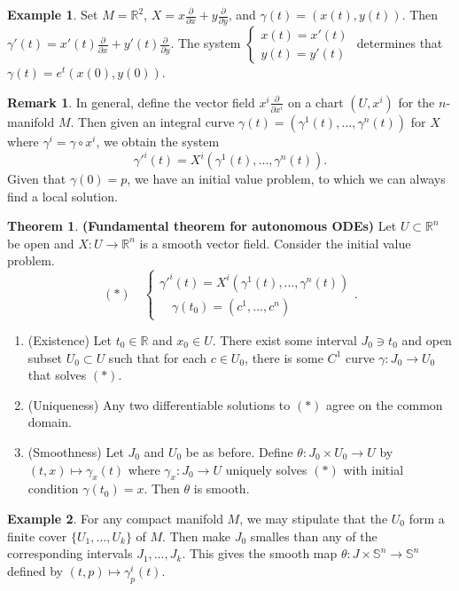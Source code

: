 \documentclass[10pt,letterpaper,cm]{nupset}
\theoremstyle{definition}
\newtheorem{exmp}{Example}
\newtheorem{remark}{Remark}
\newtheorem{theorem}{Theorem}
\newcommand{\R}{\mathbb R}
\renewcommand{\S}{\mathbb S}
\newcommand{\1}{\mathbf{1}}
\newcommand{\0}{\vec 0}
\begin{document}
\begin{exmp}
Set $M= \R^2$, $X = x\frac{\partial}{\partial{x}} + y \frac{\partial}{\partial{y}}$, and $\gamma(t) = (x(t), y(t))$. Then $\gamma'(t) = x'(t)\frac{\partial}{\partial{x}}  + y'(t)\frac{\partial}{\partial{y}}$.  The system $\begin{cases} x(t) = x'(t) \\ y(t) = y'(t) \end{cases}$ determines that 
$\gamma(t) = e^t(x(0), y(0))$.
\end{exmp}
\begin{remark}
In general, define the vector field $x^i\frac{\partial}{\partial{x^i}}$ on a chart $(U, x^i)$ for the $n$-manifold $M$. Then given an integral curve $\gamma(t) = (\gamma^1(t), \ldots, \gamma^n(t))$ for $X$ where $\gamma^i = \gamma \circ x^i$, we obtain the system $$ \gamma'^i(t) = X^i(\gamma^1(t), \ldots, \gamma^n(t)).  $$ Given that $\gamma(0) =p$, we have an initial value problem, to which we can always find a local solution.
\end{remark}

\begin{theorem}{\textbf{(Fundamental theorem for autonomous ODEs)}}
Let $U\subset \R^n$ be open and $X: U \to \R^n$ is a smooth vector field.  Consider the initial value problem.
$$(\ast) \quad \begin{cases} \gamma'^i(t) = X^i(\gamma^1(t), \ldots, \gamma^n(t)) \\ \quad  \gamma(t_0) =(c^1, \ldots, c^n) \end{cases}.$$ 
\begin{enumerate}
\item (Existence)  Let $t_0 \in \R$ and $x_0\in U$. There exist some interval $J_0 \ni t_0$ and open subset $U_0 \subset U$ such that for each $c\in U_0$, there is some $C^1$ curve $\gamma : J_0 \to U_0$ that solves  $(\ast)$.
\item (Uniqueness)  Any two differentiable solutions to $(\ast)$ agree on the common domain.
\item (Smoothness) Let $J_0$ and $U_0$ be as before. Define $\theta : J_0 \times U_0 \to U$ by $(t, x) \mapsto \gamma_x(t)$ where $\gamma_x : J_0 \to U$ uniquely solves $(\ast)$ with initial condition $\gamma(t_0) = x$. Then $\theta$ is smooth.
\end{enumerate}
\end{theorem}

\begin{exmp}
For any compact manifold $M$, we may stipulate that the $U_0$ form a finite cover $\{U_1, \ldots, U_k\}$ of $M$. Then make $J_0$ smalles than any of the corresponding intervals $J_1, \ldots, J_k$. This gives the smooth map $\theta : J \times \S^n \to \S^n$ defined by $(t, p) \mapsto \gamma_p^i(t)$.
\end{exmp}
\end{document}
